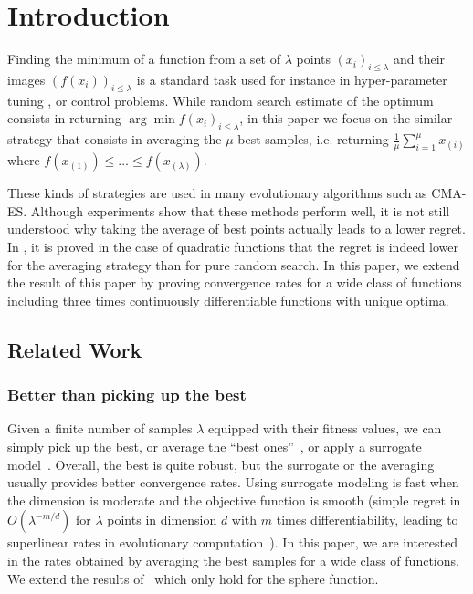 \section{Introduction}
Finding the minimum of a function from a set of $\lambda$ points $(x_i)_{i\leq \lambda}$ and their images $(f(x_i))_{i\leq \lambda}$ is a standard task used for instance in hyper-parameter tuning \cite{bergstra2012random}, or control problems. While random search estimate of the optimum consists in returning $\arg\min f(x_i)_{i\leq \lambda}$, in this paper we focus on the similar strategy that consists in averaging the $\mu$ best samples, i.e. returning $\frac1\mu\sum_{i=1}^\mu x_{(i)}$ where $f(x_{(1)})\leq\ldots\leq f(x_{(\lambda)})$.

These kinds of strategies are used in many evolutionary algorithms such as CMA-ES. Although experiments show that these methods perform well, it is not still understood why taking the average of best points actually leads to a lower regret. In \cite{ppsnkbest}, it is proved in the case of quadratic functions that the regret is indeed lower for the averaging strategy than for pure random search. In this paper, we extend the result of this paper by proving convergence rates for a wide class of functions including three times continuously differentiable functions with unique optima.


\subsection{Related Work}

\subsubsection{Better than picking up the best}
Given a finite number of samples $\lambda$ equipped with their fitness values, we can simply pick up the best, or average the ``best ones''~\cite{beyerbenefitofsex,ppsnkbest}, or apply a surrogate model~\cite{sm1,sm2,sm3,AST,sm4,bach}. Overall, the best is quite robust, but the surrogate or the averaging usually provides  better convergence rates. Using surrogate modeling is fast when the dimension is moderate and the objective function is smooth (simple regret in $O(\lambda^{-m/d})$ for $\lambda$ points in dimension $d$ with $m$ times differentiability, leading to superlinear rates in evolutionary computation~\cite{AST}). In this paper, we are interested in the rates obtained by averaging the best samples for a wide class of functions. We extend the results of~\cite{ppsnkbest} which only hold for the sphere function.

